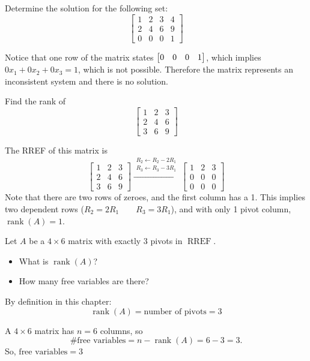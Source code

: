 \begin{Exercise}[title=Augmented Matrices 3, label=nosol]
Determine the solution for the following set:
$$\begin{bmatrix}
1&2&3&4\\
2&4&6&9\\
0&0&0&1
\end{bmatrix}$$
\end{Exercise}
\begin{Answer}[ref=nosol]
Notice that one row of the matrix states $\begin{bmatrix} 0&0&0&1 \end{bmatrix}$, which implies $0x_1 + 0x_2+0x_3=1$, which is not possible. Therefore the matrix represents an inconsistent system and there is no solution.
\end{Answer}
\begin{Exercise}[title=Rank 1, label=rank1]
Find the rank of
$$\begin{bmatrix}
1&2&3\\
2&4&6\\
3&6&9
\end{bmatrix}$$
\end{Exercise}
\begin{Answer}[ref=rank1]
The RREF of this matrix is
$$\begin{bmatrix}
1&2&3\\
2&4&6\\
3&6&9
\end{bmatrix}
\xrightarrow{\substack{R_2\leftarrow R_2-2R_1\\ R_3\leftarrow R_3-3R_1}}
\begin{bmatrix}
1&2&3\\
0&0&0\\
0&0&0
\end{bmatrix}$$
Note that there are two rows of zeroes, and the first column has a 1. This implies two dependent rows ($R_2 = 2 R_1 \qquad R_3 = 3 R_1$), and with only 1 pivot column, $\operatorname{rank}(A)=1$. 
\end{Answer}

\begin{Exercise}[title=Rank 2,label=rank2]
Let $A$ be a $4\times 6$ matrix with exactly $3$ pivots in $\operatorname{RREF}$.
\begin{itemize}
       \item What is $\operatorname{rank}(A)$?
       \item How many free variables are there?
\end{itemize}
\end{Exercise}
\begin{Answer}[ref=rank2]
By definition in this chapter:
$$\operatorname{rank}(A)=\text{number of pivots}=3$$

A $4 \times 6$ matrix has $n=6$ columns, so 
$$\text{\# free variables} = n-\operatorname{rank}(A)=6-3=3.$$
So, $\text{free variables} = 3$
\end{Answer}

